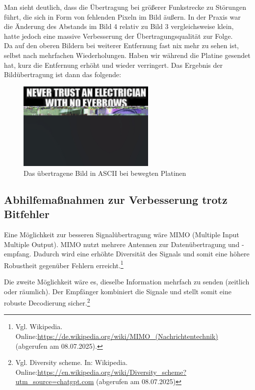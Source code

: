 Man sieht deutlich, dass die Übertragung bei größerer Funkstrecke zu Störungen führt, die sich in Form von fehlenden Pixeln im Bild äußern. 
In der Praxis war die Änderung des Abstands im Bild 4 relativ zu Bild 3 vergleichsweise klein, hatte jedoch eine massive Verbesserung der Übertragungsqualität zur Folge.
\\
Da auf den oberen Bildern bei weiterer Entfernung fast nix mehr zu sehen ist, selbst nach mehrfachen Wiederholungen.
Haben wir während die Platine gesendet hat, kurz die Entfernung erhöht und wieder verringert. Das Ergebnis der Bildübertragung ist dann das folgende:
\begin{figure}[H]
    \centering
    \includegraphics[width=0.6\textwidth]{Pictures/memeASCIIbewegt.jpg}
    \caption{Das übertragene Bild in ASCII bei bewegten Platinen}
    \label{fig:Task2e}
\end{figure}
\subsection{Abhilfemaßnahmen zur Verbesserung trotz Bitfehler}
Eine Möglichkeit zur besseren Signalübertragung wäre MIMO (Multiple Input Multiple Output). MIMO nutzt mehrere Antennen zur Datenübertragung und -empfang. Dadurch wird eine erhöhte Diversität des Signals und somit eine höhere Robustheit gegenüber Fehlern erreicht.\footnote{Vgl. Wikipedia. Online:\url{https://de.wikipedia.org/wiki/MIMO_(Nachrichtentechnik)} (abgerufen am 08.07.2025).}

Die zweite Möglichkeit wäre es, dieselbe Information mehrfach zu senden (zeitlich oder räumlich). Der Empfänger kombiniert die Signale und stellt somit eine robuste Decodierung sicher.\footnote{Vgl. Diversity scheme. In: Wikipedia. Online:\url{https://en.wikipedia.org/wiki/Diversity_scheme?utm_source=chatgpt.com} (abgerufen am 08.07.2025)}
